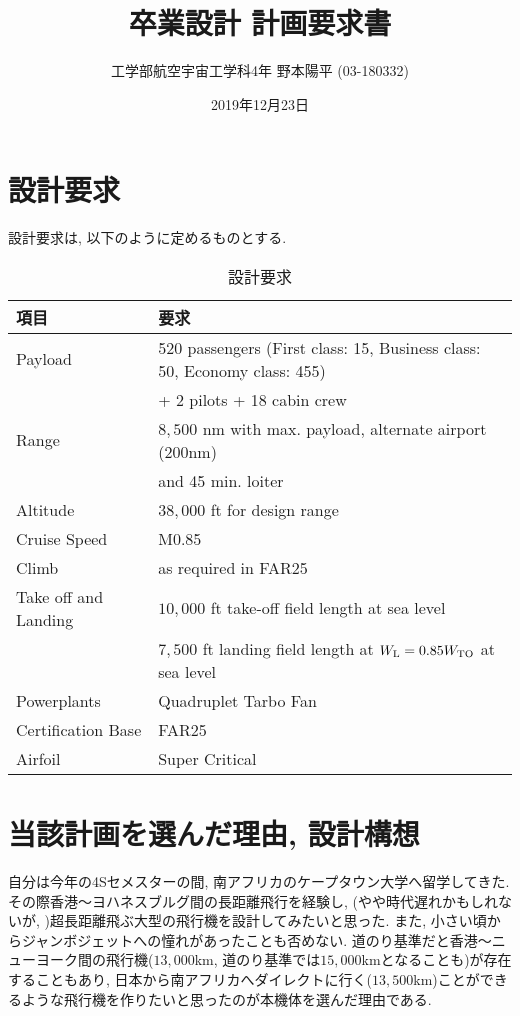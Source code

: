 \documentclass[12pt]{jsarticle}
\title{\Huge{卒業設計 計画要求書}}
\author{\LARGE{工学部航空宇宙工学科4年 野本陽平 (03-180332)}}
\date{\large{2019年12月23日}}
\begin{document}
\maketitle
\newpage
\tableofcontents
\newpage
\section{設計要求}
設計要求は, 以下のように定めるものとする.
\begin{table}[htb]
	\caption{設計要求}
	\begin{center}
		\begin{tabular}{ll} \hline
			項目 & 要求 \\ \hline \hline
			Payload & 520 passengers (First class: 15, Business class: 50, Economy class: 455) \\ 
			 & + 2 pilots + 18 cabin crew \\
			Range & $8,500$ nm with max. payload, alternate airport (200nm) \\
			 & and 45 min. loiter \\
			Altitude & $38,000$ ft for design range \\
			Cruise Speed & M0.85 \\
			Climb & as required in FAR25 \\
			Take off and Landing & $10,000$ ft take-off field length at sea level \\
			 & $7,500$ ft landing field length at $W_{\rm L} = 0.85 W_{\rm TO}$ at sea level \\
			Powerplants & Quadruplet Tarbo Fan \\
			Certification Base & FAR25 \\
			Airfoil & Super Critical \\ \hline
		\end{tabular}
	\end{center}
\end{table}
\section{当該計画を選んだ理由, 設計構想}
自分は今年の4Sセメスターの間, 南アフリカのケープタウン大学へ留学してきた. その際香港〜ヨハネスブルグ間の長距離飛行を経験し, (やや時代遅れかもしれないが, )超長距離飛ぶ大型の飛行機を設計してみたいと思った. また, 小さい頃からジャンボジェットへの憧れがあったことも否めない. 道のり基準だと香港〜ニューヨーク間の飛行機($13,000$km, 道のり基準では$15,000$kmとなることも)が存在することもあり, 日本から南アフリカへダイレクトに行く($13,500$km)ことができるような飛行機を作りたいと思ったのが本機体を選んだ理由である.
\newpage
\end{document}
